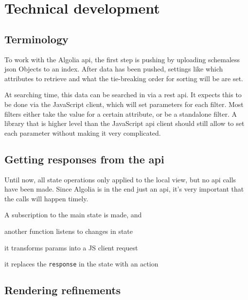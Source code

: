 
\chapter{Technical development} %
\label{chp:execution}

\section{Terminology}
\label{sec:terminology}

To work with the Algolia \acrshort{api}, the first step is pushing by uploading schemaless \acrshort{json} Objects to an \gls{index}. After data has been pushed, settings like which attributes to retrieve and what the tie-breaking order for sorting will be are set. 

At searching time, this data can be searched in via a \acrshort{rest} \acrshort{api}. It expects this to be done via the JavaScript client, which will set parameters for each filter. Most filters either take the value for a certain \gls{attribute}, or be a standalone filter. A library that is higher level than the JavaScript \acrshort{api} client should still allow to set each parameter without making it very complicated.




\section{Getting responses from the \acrshort{api}} %
\label{sec:getting_responses_from_the_api}

Until now, all state operations only applied to the local view, but no \acrshort{api} calls have been made. Since Algolia is in the end just an \acrshort{api}, it's very important that the calls will happen timely. 

A subscription to the main state is made, and 

another function listens to changes in state %

it transforms params into a JS client request

it replaces the {\tt response} in the state with an action


\section{Rendering \glspl{refinement}} %
\label{sec:rendering_refinements}

